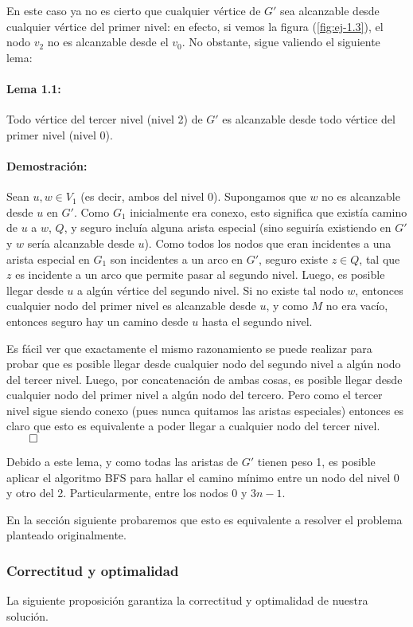 En este caso ya no es cierto que cualquier vértice de $G'$ sea alcanzable desde cualquier vértice del primer nivel: en efecto, si vemos la figura (\ref{fig:ej-1.3}), el nodo $v_2$ no es alcanzable desde el $v_0$. No obstante, sigue valiendo el siguiente lema:

\paragraph*{Lema 1.1: }Todo vértice del tercer nivel (nivel 2) de $G'$ es alcanzable desde todo vértice del primer nivel (nivel 0). 

\paragraph*{Demostración: }Sean $u,w\in V_1$ (es decir, ambos del nivel 0). Supongamos que $w$ no es alcanzable desde $u$ en $G'$. Como $G_1$ inicialmente era conexo, esto significa que existía camino de $u$ a $w$, $Q$, y seguro incluía alguna arista especial (sino seguiría existiendo en $G'$ y $w$ sería alcanzable desde $u$). Como todos los nodos que eran incidentes a una arista especial en $G_1$ son incidentes a un arco en $G'$, seguro existe $z\in Q$, tal que $z$ es incidente a un arco que permite pasar al segundo nivel. Luego, es posible llegar desde $u$ a algún vértice del segundo nivel. Si no existe tal nodo $w$, entonces cualquier nodo del primer nivel es alcanzable desde $u$, y como $M$ no era vacío, entonces seguro hay un camino desde $u$ hasta el segundo nivel.

Es fácil ver que exactamente el mismo razonamiento se puede realizar para probar que es posible llegar desde cualquier nodo del segundo nivel a algún nodo del tercer nivel. Luego, por concatenación de ambas cosas, es posible llegar desde cualquier nodo del primer nivel a algún nodo del tercero. Pero como el tercer nivel sigue siendo conexo (pues nunca quitamos las aristas especiales) entonces es claro que esto es equivalente a poder llegar a cualquier nodo del tercer nivel. $\qed$

Debido a este lema, y como todas las aristas de $G'$ tienen peso 1, es posible aplicar el algoritmo BFS para hallar el camino mínimo entre un nodo del nivel 0 y otro del 2. Particularmente, entre los nodos 0 y $3n-1$. 

En la sección siguiente probaremos que esto es equivalente a resolver el problema planteado originalmente.

\subsubsection{Correctitud y optimalidad}
La siguiente proposición garantiza la correctitud y optimalidad de nuestra solución.

